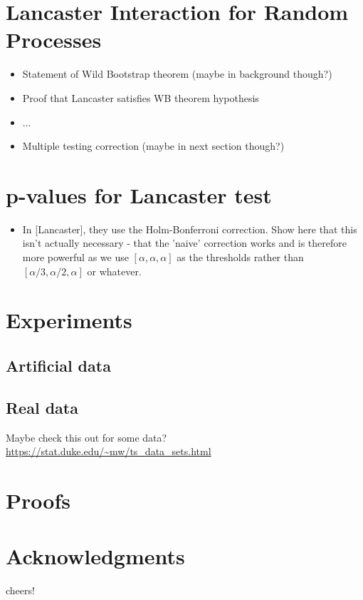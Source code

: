 \documentclass{article}
\begin{document}
\section{Lancaster Interaction for Random Processes}
\begin{itemize}
\item Statement of Wild Bootstrap theorem (maybe in background though?)
\item Proof that Lancaster satisfies WB theorem hypothesis
\item ...
\item Multiple testing correction (maybe in next section though?)
\end{itemize}

\section{p-values for Lancaster test}
\begin{itemize}
\item In [Lancaster], they use the Holm-Bonferroni correction. Show here that this isn't actually necessary - that the 'naive' correction works and is therefore more powerful as we use $[\alpha,\alpha,\alpha]$ as the thresholds rather than $[\alpha/3,\alpha/2,\alpha]$ or whatever.	
\end{itemize}


\section{Experiments}
\subsection{Artificial data}
\subsection{Real data}
Maybe check this out for some data? \url{https://stat.duke.edu/~mw/ts_data_sets.html}

\section{Proofs}

\section*{Acknowledgments} 
cheers!


\end{document}

